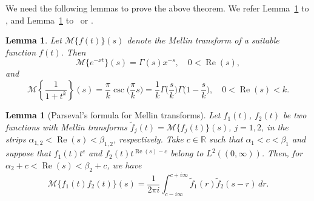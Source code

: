 \documentclass[11pt,a4paper]{amsart}
\renewcommand{\Re}{\operatorname{Re}}
\theoremstyle{plain}
\theoremstyle{plain}
\newtheorem{lemma}[theorem]{Lemma}
\theoremstyle{remark}
\numberwithin{equation}{section}
\begin{document}
We need the following lemmas to prove the above theorem. 
We refer Lemma~\ref{lem:mellin-tran} to \cite[Chapter VI]{EMOT-TIT-v1}, and Lemma~\ref{lem:parseval} to~\cite[\S\,8.2 and \S\,8.3]{DB} or \cite[Theorem~73, p.~95]{Tit}.

\begin{lemma}
\label{lem:mellin-tran}
Let $\mathcal{M}\{f(t)\}(s)$ denote the Mellin transform of a suitable function $f(t)$. Then
\[
  \mathcal{M}\{e^{-xt}\}(s) = \Gamma(s)x^{-s}, \quad 0<\Re(s),
\]
and
\[
  \mathcal{M}\left\{\frac{1}{1+t^k}\right\}(s) 
  = \frac{\pi}{k} \csc\Big( \frac{\pi}{k}s \Big) 
  = \frac{1}{k} \Gamma \Big(\frac{s}{k}\Big) \Gamma\Big(1-\frac{s}{k}\Big), \quad 0<\Re(s)<k.
\]
\end{lemma}


\begin{lemma}[Parseval's formula for Mellin transforms]
\label{lem:parseval}
Let $f_1(t)$, $f_2(t)$ be two functions with Mellin transforms $\tilde{f}_{j}(t) = \mathcal{M}\{f_{j}(t)\}(s)$, $j = 1,2$, in the strips $\alpha_{1,2} < \Re(s) < \beta_{1,2}$, respectively. Take $c \in \mathbb{R}$ such that $\alpha_1< c <\beta_1$ and suppose that $f_1(t)t^c$ and $f_2(t)t^{\Re(s) -c}$ belong to $L^2((0,\infty))$. Then, for $\alpha_2+c<\Re(s)<\beta_2+c$, we have
\[
  \mathcal{M}\{f_1(t)f_2(t)\}(s) 
  = \frac{1}{2\pi i} \int_{c-i\infty}^{c+i\infty} \tilde{f}_1(r) \tilde{f}_2(s-r)\, dr.
\]
\end{lemma}
\end{document}
